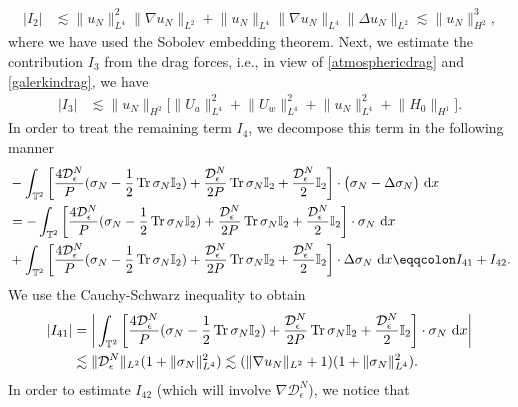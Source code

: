 \documentclass[12pt,a4paper]{article}
\theoremstyle{definition}
\theoremstyle{remark}
\numberwithin{equation}{section}
\newcommand{\dx}{\ {\rm d} {x}}
\DeclareMathOperator{\Tr}{Tr}
\begin{document}
\begin{align*}
\lvert I_2 \rvert &\lesssim \lVert u_N \rVert_{L^4}^2 \lVert \nabla u_N \rVert_{L^2} + \lVert u_N \rVert_{L^4} \lVert \nabla u_N \rVert_{L^4} \lVert \Delta u_N \rVert_{L^2} \lesssim \lVert u_N \rVert_{H^2}^3, 
\end{align*}
where we have used the Sobolev embedding theorem. Next, we estimate the contribution $I_3$ from the drag forces, i.e., in view of \eqref{atmosphericdrag} and \eqref{galerkindrag}, we have
\begin{align*}
\lvert I_3 \rvert &\lesssim \lVert u_N \rVert_{H^2} \bigg[ \lVert U_a \rVert_{L^4}^2 + \lVert U_w \rVert_{L^4}^2 + \lVert u_N \rVert_{L^4}^2 + \lVert H_0 \rVert_{H^1} \bigg].
\end{align*}
In order to treat the remaining term $I_4$, we decompose this term in the following manner
\begin{align*}
&- \int_{\mathbb{T}^2} \bigg[ \frac{4 \mathcal{D}_\epsilon^N}{P} (\sigma_N - \frac{1}{2} \Tr \sigma_N \mathbb I_2) + \frac{\mathcal{D}_\epsilon^N}{2 P} \Tr \sigma_N \mathbb I_2 + \frac{\mathcal{D}_\epsilon^N}{2} \mathbb I_2 \bigg] \cdot \big(\sigma_N - \Delta \sigma_N \big) \dx \\
&= - \int_{\mathbb{T}^2} \bigg[ \frac{4 \mathcal{D}_\epsilon^N}{P} (\sigma_N - \frac{1}{2} \Tr \sigma_N \mathbb I_2) + \frac{\mathcal{D}_\epsilon^N}{2 P} \Tr \sigma_N \mathbb I_2 + \frac{\mathcal{D}_\epsilon^N}{2} \mathbb I_2 \bigg] \cdot \sigma_N \dx \\
&+ \int_{\mathbb{T}^2} \bigg[ \frac{4 \mathcal{D}_\epsilon^N}{P} (\sigma_N - \frac{1}{2} \Tr \sigma_N \mathbb I_2) + \frac{\mathcal{D}_\epsilon^N}{2 P} \Tr \sigma_N \mathbb I_2 + \frac{\mathcal{D}_\epsilon^N}{2} \mathbb I_2 \bigg] \cdot \Delta \sigma_N \dx \eqqcolon I_{41} + I_{42}.
\end{align*}
We use the Cauchy-Schwarz inequality to obtain
\begin{align*}
\lvert I_{41} \rvert &= \bigg\lvert \int_{\mathbb{T}^2} \bigg[ \frac{4 \mathcal{D}_\epsilon^N}{P} (\sigma_N - \frac{1}{2} \Tr \sigma_N \mathbb I_2) + \frac{\mathcal{D}_\epsilon^N}{2 P} \Tr \sigma_N \mathbb I_2 + \frac{\mathcal{D}_\epsilon^N}{2} \mathbb I_2 \bigg] \cdot \sigma_N \dx \bigg\rvert \\
&\lesssim \lVert \mathcal{D}_\epsilon^N \rVert_{L^2} (1 + \lVert \sigma_N \rVert_{L^4}^2) \lesssim (\lVert \nabla u_N \rVert_{L^2} + 1) (1 + \lVert \sigma_N \rVert_{L^4}^2).
\end{align*}
In order to estimate $I_{42}$ (which will involve $\nabla \mathcal{D}_\epsilon^N$), we notice that
\end{document}
